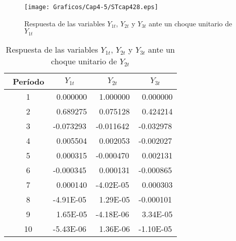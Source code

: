 \begin{figure}[H]
\centering
\texttt{[image: Graficos/Cap4-5/STcap428.eps]}
\caption{Respuesta de las variables $Y_{1t}$, $Y_{2t}$ y $Y_{3t}$ ante un choque unitario de $Y_{1t}$}
\label{fig28}
\end{figure}

\begin{table}[H]
\centering
\begin{tabular}{cccc}\hline\hline
~Per\'{i}odo & $Y_{1t}$ & $Y_{2t}$ & $Y_{3t}$\\ \hline\hline
~1 & ~0.000000 & ~1.000000 & ~0.000000 \\
~2 & ~0.689275 & ~0.075128 & ~0.424214 \\
~3 & -0.073293 & -0.011642 & -0.032978 \\
~4 & ~0.005504 & ~0.002053 & -0.002027 \\
~5 & ~0.000315 & -0.000470 & ~0.002131 \\
~6 & -0.000345 & ~0.000131 & -0.000865 \\
~7 & ~0.000140 & -4.02E-05 & ~0.000303 \\
~8 & -4.91E-05 & ~1.29E-05 & -0.000101 \\
~9 & ~1.65E-05 & -4.18E-06 & ~3.34E-05 \\
~10& -5.43E-06 & ~1.36E-06 & -1.10E-05 \\ \hline\hline
\end{tabular}
\caption{Respuesta de las variables $Y_{1t}$, $Y_{2t}$ y $Y_{3t}$ ante un choque unitario de $Y_{2t}$}
\label{tab25}
\end{table}


